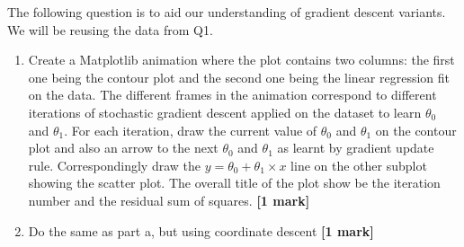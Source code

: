 \documentclass[colorlinks,linkcolor=true]{article}
\begin{document}


\item The following question is to aid our understanding of gradient descent variants. We will be reusing the data from Q1. 
\begin{enumerate}
	\item Create a Matplotlib animation where the plot contains two columns: the first one being the contour plot and the second one being the linear regression fit on the data. The different frames in the animation correspond to different iterations of stochastic gradient descent applied on the dataset to learn $\theta_0$ and $\theta_1$. For each iteration, draw the current value of $\theta_0$ and $\theta_1$ on the contour plot and also an arrow to the next $\theta_0$ and $\theta_1$ as learnt by gradient update rule. Correspondingly draw the $y = \theta_0 + \theta_1\times x$ line on the other subplot showing the scatter plot. The overall title of the plot show be the iteration number and the residual sum of squares. \textbf{[1 mark]}
		\item Do the same as part a, but using coordinate descent \textbf{[1 mark]}
\end{enumerate}
\end{document}
